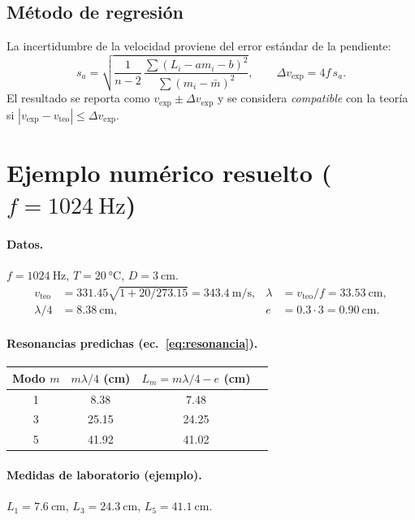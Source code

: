 \documentclass[11pt,a4paper]{article}
\newcommand{\vexp}{v_{\text{exp}}}
\newcommand{\vteo}{v_{\text{teo}}}
\begin{document}
\subsection{Método de regresión}
La incertidumbre de la velocidad proviene del error estándar de la pendiente:
\begin{equation}
  s_a = \sqrt{\frac{1}{n-2}\,\frac{\sum (L_i - a m_i - b)^2}{\sum (m_i-\bar m)^2}},
  \qquad \Delta\vexp = 4 f\, s_a .
  \label{eq:prop_reg}
\end{equation}
El resultado se reporta como $\vexp \pm \Delta\vexp$ y se considera \emph{compatible} con la
teoría si $|\vexp-\vteo|\le \Delta\vexp$.

\section{Ejemplo numérico resuelto ($f=\SI{1024}{\hertz}$)}

\paragraph{Datos.} $f=\SI{1024}{\hertz}$, $T=\SI{20}{\celsius}$, $D=\SI{3}{\centi\meter}$.
\begin{align*}
  \vteo &= 331.45\sqrt{1+20/273.15} = \SI{343.4}{\meter\per\second}, &
  \lambda &= \vteo/f = \SI{33.53}{\centi\meter},\\
  \lambda/4 &= \SI{8.38}{\centi\meter}, & e &= 0.3\cdot 3 = \SI{0.90}{\centi\meter}.
\end{align*}

\paragraph{Resonancias predichas (ec.~\eqref{eq:resonancia}).}
\begin{center}
\begin{tabular}{cccc}
\toprule
Modo $m$ & $m\lambda/4$ (cm) & $L_m = m\lambda/4 - e$ (cm) \\
\midrule
1 & 8.38  & 7.48 \\
3 & 25.15 & 24.25 \\
5 & 41.92 & 41.02 \\
\bottomrule
\end{tabular}
\end{center}

\paragraph{Medidas de laboratorio (ejemplo).}
$L_1=\SI{7.6}{\centi\meter}$, $L_3=\SI{24.3}{\centi\meter}$, $L_5=\SI{41.1}{\centi\meter}$.
\end{document}
